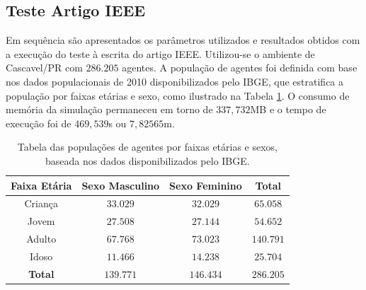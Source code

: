 % 

\subsection{Teste Artigo IEEE}

Em sequência são apresentados os parâmetros utilizados e resultados obtidos com a execução do teste à escrita do artigo IEEE. Utilizou-se o ambiente de Cascavel/PR com $286.205$ agentes. A população de agentes foi definida com base nos dados populacionais de 2010 disponibilizados pelo IBGE, que estratifica a população por faixas etárias e sexo, como ilustrado na Tabela \ref{tab:populacoes_0003}. O consumo de memória da simulação permaneceu em torno de $337,732$MB e o tempo de execução foi de $469,539$s ou $7,82565$m. \\

\begin{table}[H]
\centering
\begin{tabular}{c|c|c|c}
 \textbf{Faixa Etária} 		& \textbf{Sexo Masculino}	& \textbf{Sexo Feminino}	& \textbf{Total}	\\ \hline
  Criança			& $33.029$			& $32.029$			& $65.058$		\\
  Jovem				& $27.508$			& $27.144$			& $54.652$		\\
  Adulto			& $67.768$			& $73.023$			& $140.791$		\\
  Idoso				& $11.466$			& $14.238$ 			& $25.704$		\\ \hline
  \textbf{Total}		& $139.771$			& $146.434$			& $286.205$		\\
\end{tabular}
\caption{Tabela das populações de agentes por faixas etárias e sexos, baseada nos dados disponibilizados pelo IBGE.}
\label{tab:populacoes_0003}
\end{table}

